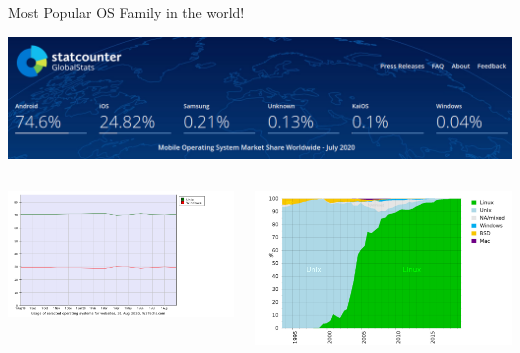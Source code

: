 \documentclass[12pt]{beamer}
\begin{document}
\begin{frame}{Most Popular OS Family in the world!}
  \begin{center}
    \includegraphics[width=0.75\linewidth]{phone-share}
  \end{center}

  \begin{columns}
    \begin{column}{0.5\linewidth}
      \includegraphics[width=\linewidth]{server}
    \end{column}
    \begin{column}{0.5\linewidth}
      \includegraphics[width=\linewidth]{supercomputer}
    \end{column}
  \end{columns}
\end{frame}
\end{document}
